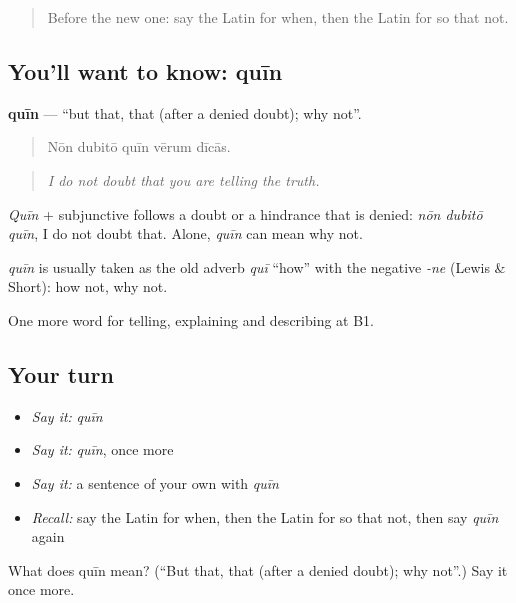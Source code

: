 \label{lesson:LA-C367-quin}



\begin{quote}
Before the new one: say the Latin for when, then the Latin for so that not.
\end{quote}

\subsection*{You'll want to know: quīn}
\textbf{quīn} — \textquotedblleft{}but that, that (after a denied doubt); why not\textquotedblright{}.

\begin{quote}
Nōn dubitō quīn vērum dīcās.
\end{quote}

\begin{quote}
\emph{I do not doubt that you are telling the truth.}
\end{quote}

\emph{Quīn} + subjunctive follows a doubt or a hindrance that is denied: \emph{nōn dubitō quīn}, I do not doubt that. Alone, \emph{quīn} can mean why not.

\begin{cousinweb}
\emph{quīn} is usually taken as the old adverb \emph{quī} \textquotedblleft{}how\textquotedblright{} with the negative \emph{-ne} (Lewis \& Short): how not, why not.
\end{cousinweb}

\begin{grammarlens}[title={What you've built}]
One more word for telling, explaining and describing at B1.
\end{grammarlens}

\subsection*{Your turn}
\begin{itemize}
\raggedright
  \item \emph{Say it:} \emph{quīn}
  \item \emph{Say it:} \emph{quīn}, once more
  \item \emph{Say it:} a sentence of your own with \emph{quīn}
  \item \emph{Recall:} say the Latin for when, then the Latin for so that not, then say \emph{quīn} again
\end{itemize}

\begin{tcolorbox}[breakable,colback=teal!4,colframe=teal!35!black,title={Before you move on}]
What does quīn mean? (\textquotedblleft{}But that, that (after a denied doubt); why not\textquotedblright{}.) Say it once more.
\end{tcolorbox}
